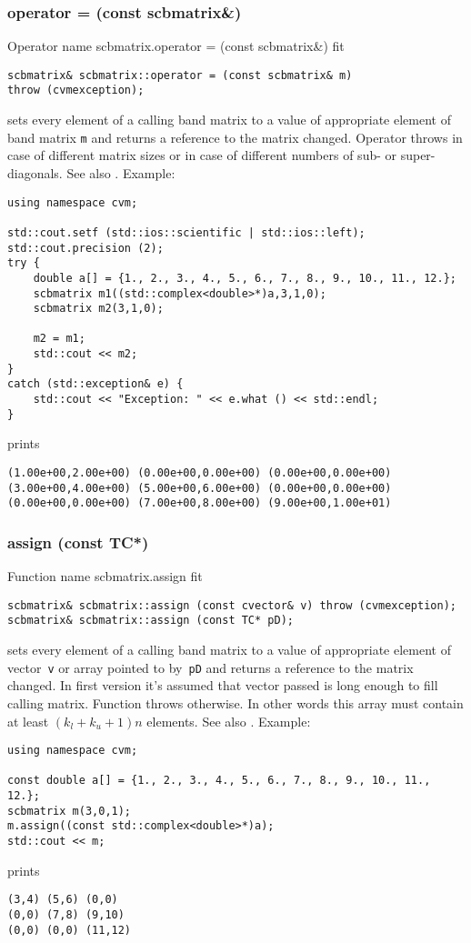 \subsubsection{operator = (const scbmatrix\&)}
Operator%
\pdfdest name {scbmatrix.operator = (const scbmatrix&)} fit
\begin{verbatim}
scbmatrix& scbmatrix::operator = (const scbmatrix& m)
throw (cvmexception);
\end{verbatim}
sets every element of a calling band matrix to a value of
appropriate element of  band matrix \verb"m"
and returns a reference to
the matrix changed.
Operator throws  
in case of different matrix sizes or in case of different numbers
of sub- or super-diagonals.
See also .
Example:
\begin{Verbatim}
using namespace cvm;

std::cout.setf (std::ios::scientific | std::ios::left); 
std::cout.precision (2);
try {
    double a[] = {1., 2., 3., 4., 5., 6., 7., 8., 9., 10., 11., 12.};
    scbmatrix m1((std::complex<double>*)a,3,1,0);
    scbmatrix m2(3,1,0);

    m2 = m1;
    std::cout << m2;
}
catch (std::exception& e) {
    std::cout << "Exception: " << e.what () << std::endl;
}
\end{Verbatim}
prints
\begin{Verbatim}
(1.00e+00,2.00e+00) (0.00e+00,0.00e+00) (0.00e+00,0.00e+00)
(3.00e+00,4.00e+00) (5.00e+00,6.00e+00) (0.00e+00,0.00e+00)
(0.00e+00,0.00e+00) (7.00e+00,8.00e+00) (9.00e+00,1.00e+01)
\end{Verbatim}
\newpage



\subsubsection{assign (const TC*)}
Function%
\pdfdest name {scbmatrix.assign} fit
\begin{verbatim}
scbmatrix& scbmatrix::assign (const cvector& v) throw (cvmexception);
scbmatrix& scbmatrix::assign (const TC* pD);
\end{verbatim}
sets every element of a calling band matrix to a value of
appropriate element of  vector~\verb'v'
or array pointed to by~\verb"pD"
and returns a reference to
the matrix changed.
In first version it's assumed that vector passed is long
enough to fill calling matrix. Function throws  
otherwise.
In other words this array must contain at least $(k_l + k_u + 1)n$ elements.
See also .
Example:
\begin{Verbatim}
using namespace cvm;

const double a[] = {1., 2., 3., 4., 5., 6., 7., 8., 9., 10., 11., 12.};
scbmatrix m(3,0,1);
m.assign((const std::complex<double>*)a);
std::cout << m;
\end{Verbatim}
prints
\begin{Verbatim}
(3,4) (5,6) (0,0)
(0,0) (7,8) (9,10)
(0,0) (0,0) (11,12)
\end{Verbatim}
\newpage



